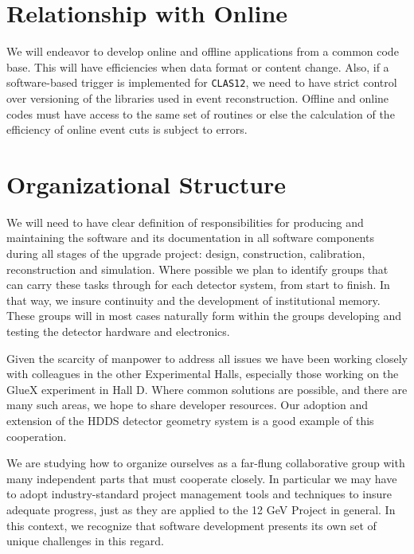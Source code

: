 \section{Relationship with Online}

We will endeavor to develop online and offline applications from a common 
code base. This will have efficiencies when data format or content change. 
Also, if a software-based trigger is implemented for {\tt CLAS12}, we need 
to have strict control over versioning of the libraries used in event 
reconstruction. Offline and online codes must have access to the same set 
of routines or else the calculation of the efficiency of online event cuts 
is subject to errors.

\section{Organizational Structure}

We will need to have clear definition of responsibilities for producing and 
maintaining the software and its documentation in all software components 
during all stages of the upgrade project: design, construction, calibration, 
reconstruction and simulation. Where possible we plan to identify groups that 
can carry these tasks through for each detector system, from start to finish. 
In that way, we insure continuity and the development of institutional memory. 
These groups will in most cases naturally form within the groups developing 
and testing the detector hardware and electronics.

Given the scarcity of manpower to address all issues we have been working 
closely with colleagues in the other Experimental Halls, especially those 
working on the GlueX experiment in Hall D. Where common solutions are 
possible, and there are many such areas, we hope to share developer resources. 
Our adoption and extension of the HDDS detector geometry system is a good 
example of this cooperation.

We are studying how to organize ourselves as a far-flung collaborative group 
with many independent parts that must cooperate closely. In particular we may 
have to adopt industry-standard project management tools and techniques to 
insure adequate progress, just as they are applied to the 12 GeV Project in 
general.  In this context, we recognize that software development presents 
its own set of unique challenges in this regard.
